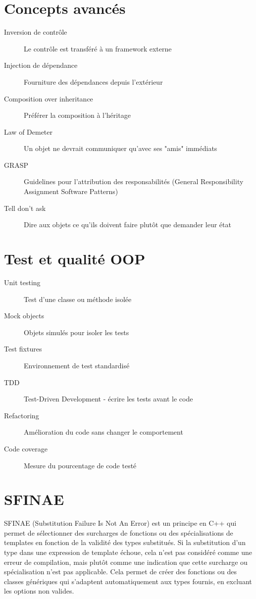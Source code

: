 \documentclass[9pt]{extarticle}
\begin{document}
\begin{multicols*}{3}
\section*{Concepts avancés}
\begin{description}
\item[Inversion de contrôle] Le contrôle est transféré à un framework externe
\item[Injection de dépendance] Fourniture des dépendances depuis l'extérieur
\item[Composition over inheritance] Préférer la composition à l'héritage
\item[Law of Demeter] Un objet ne devrait communiquer qu'avec ses "amis" immédiats
\item[GRASP] Guidelines pour l'attribution des responsabilités (General Responsibility Assignment Software Patterns)
\item[Tell don't ask] Dire aux objets ce qu'ils doivent faire plutôt que demander leur état
\end{description}

\section*{Test et qualité OOP}
\begin{description}
\item[Unit testing] Test d'une classe ou méthode isolée
\item[Mock objects] Objets simulés pour isoler les tests
\item[Test fixtures] Environnement de test standardisé
\item[TDD] Test-Driven Development - écrire les tests avant le code
\item[Refactoring] Amélioration du code sans changer le comportement
\item[Code coverage] Mesure du pourcentage de code testé
\end{description}

\section*{SFINAE}
SFINAE (Substitution Failure Is Not An Error) est un principe en C++ qui permet de sélectionner des surcharges de fonctions ou des spécialisations de templates en fonction de la validité des types substitués. Si la substitution d'un type dans une expression de template échoue, cela n'est pas considéré comme une erreur de compilation, mais plutôt comme une indication que cette surcharge ou spécialisation n'est pas applicable. Cela permet de créer des fonctions ou des classes génériques qui s'adaptent automatiquement aux types fournis, en excluant les options non valides.


\end{multicols*}
\end{document}
